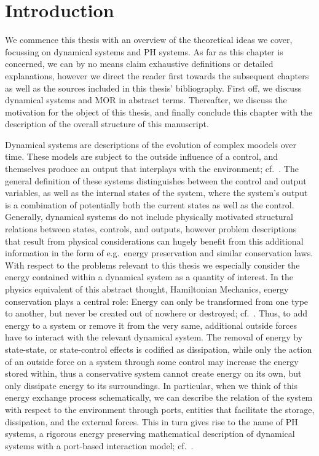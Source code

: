 \chapter{Introduction}

We commence this thesis with an overview of the theoretical ideas we cover, focussing on dynamical systems and \ac{PH} systems.
As far as this chapter is concerned, we can by no means claim exhaustive definitions or detailed explanations, however we direct the reader first towards the subsequent chapters as well as the sources included in this thesis' bibliography.
First off, we discuss dynamical systems and \ac{MOR} in abstract terms.
Thereafter, we discuss the motivation for the object of this thesis, and finally conclude this chapter with the description of the overall structure of this manuscript.

Dynamical systems are descriptions of the evolution of complex moodels over time.
These models are subject to the outside influence of a control, and themselves produce an output that interplays with the environment; cf.~\cite{Hinrichsen2005}.
The general definition of these systems distinguishes between the control and output variables, as well as the internal states of the system, where the system's output is a combination of potentially both the current states as well as the control.
Generally, dynamical systems do not include physically motivated structural relations between states, controls, and outputs, however problem descriptions that result from physical considerations can hugely benefit from this additional information in the form of e.g.\ energy preservation and similar conservation laws.
With respect to the problems relevant to this thesis we especially consider the energy contained within a dynamical system as a quantity of interest.
In the physics equivalent of this abstract thought, Hamiltonian Mechanics, energy conservation plays a central role: Energy can only be transformed from one type to another, but never be created out of nowhere or destroyed; cf.~\cite{Taylor2005, Giorgilli2022}.
Thus, to add energy to a system or remove it from the very same, additional outside forces have to interact with the relevant dynamical system.
The removal of energy by state-state, or state-control effects is codified as dissipation, while only the action of an outside force on a system through some control may increase the energy stored within, thus a conservative system cannot create energy on its own, but only dissipate energy to its surroundings.
In particular, when we think of this energy exchange process schematically, we can describe the relation of the system with respect to the environment through ports, entities that facilitate the storage, dissipation, and the external forces.
This in turn gives rise to the name of \ac{PH} systems, a rigorous energy preserving mathematical description of dynamical systems with a port-based interaction model; cf.~\cite{Duindam2009, Jacob2012, VanDerSchaft2014, Mehrmann2022}.

